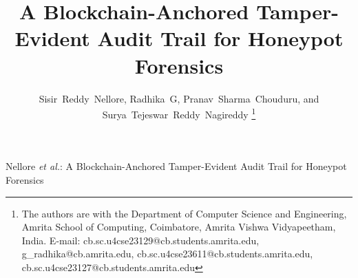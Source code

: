 \documentclass[journal]{IEEEtran}
\begin{document}
\title{A Blockchain-Anchored Tamper-Evident Audit Trail for Honeypot Forensics}

\author{Sisir~Reddy~Nellore, Radhika~G, Pranav~Sharma~Chouduru, and Surya~Tejeswar~Reddy~Nagireddy%
\thanks{The authors are with the Department of Computer Science and
Engineering, Amrita School of Computing, Coimbatore, Amrita Vishwa
Vidyapeetham, India. E-mail: cb.sc.u4cse23129@cb.students.amrita.edu,
g\_radhika@cb.amrita.edu, cb.sc.u4cse23611@cb.students.amrita.edu,
cb.sc.u4cse23127@cb.students.amrita.edu}}

%
{Nellore \MakeLowercase{\textit{et al.}}: A Blockchain-Anchored Tamper-Evident Audit Trail for Honeypot Forensics}

\maketitle
\end{document}
